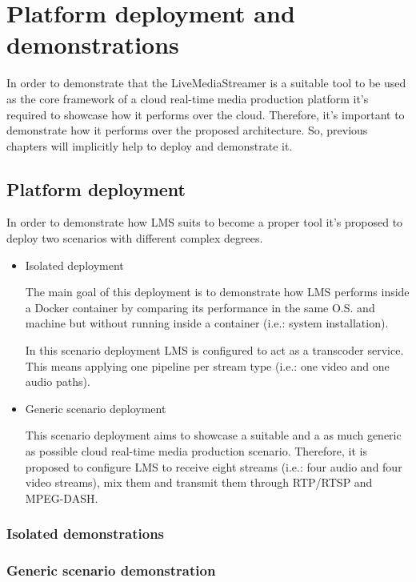 \chapter{Platform deployment and demonstrations}\label{H:platformDeploymentAndDemonstrations}

In order to demonstrate that the LiveMediaStreamer is a suitable tool to be used as the core framework of a cloud real-time media production platform it's required to showcase how it performs over the cloud. Therefore, it's important to demonstrate how it performs over the proposed architecture. So, previous chapters will implicitly help to deploy and demonstrate it.

\section{Platform deployment}

In order to demonstrate how LMS suits to become a proper tool it's proposed to deploy two scenarios with different complex degrees.

\begin{itemize}
\item Isolated deployment \hfill

The main goal of this deployment is to demonstrate how LMS performs inside a Docker container by comparing its performance in the same O.S. and machine but without running inside a container (i.e.: system installation).

In this scenario deployment LMS is configured to act as a transcoder service. This means applying one pipeline per stream type (i.e.: one video and one audio paths).

\item Generic scenario deployment \hfill

This scenario deployment aims to showcase a suitable and a as much generic as possible cloud real-time media production scenario. Therefore, it is proposed to configure LMS to receive eight streams (i.e.: four audio and four video streams), mix them and transmit them through RTP/RTSP and MPEG-DASH. 
\end{itemize}

\subsection{Isolated demonstrations}


\subsection{Generic scenario demonstration}

